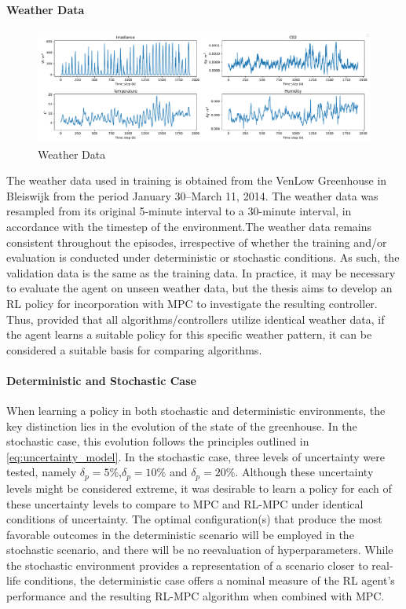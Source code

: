 \paragraph{Weather Data}

\begin{figure}[h]
    \centering
    \includegraphics[width=\textwidth]{figures/weather_data.pdf}
    \caption{Weather Data}
    \label{fig:weather-data}
\end{figure}

The weather data used in training is obtained from the VenLow Greenhouse in Bleiswijk from the period January 30–March 11, 2014. The weather data was resampled from its original 5-minute interval to a 30-minute interval, in accordance with the timestep of the environment.The weather data remains consistent throughout the episodes, irrespective of whether the training and/or evaluation is conducted under deterministic or stochastic conditions. As such, the validation data is the same as the training data. In practice, it may be necessary to evaluate the agent on unseen weather data, but the thesis aims to develop an RL policy for incorporation with MPC to investigate the resulting controller. Thus, provided that all algorithms/controllers utilize identical weather data, if the agent learns a suitable policy for this specific weather pattern, it can be considered a suitable basis for comparing algorithms.


\paragraph{Deterministic and Stochastic Case}
When learning a policy in both stochastic and deterministic environments, the key distinction lies in the evolution of the state of the greenhouse. In the stochastic case, this evolution follows the principles outlined in \autoref{eq:uncertainty_model}. In the stochastic case, three levels of uncertainty were tested, namely $\delta_p = 5\%$,$\delta_p = 10\%$ and $\delta_p = 20\%$. Although these uncertainty levels might be considered extreme, it was desirable to learn a policy for each of these uncertainty levels to compare to MPC and RL-MPC under identical conditions of uncertainty. The optimal configuration(s) that produce the most favorable outcomes in the deterministic scenario will be employed in the stochastic scenario, and there will be no reevaluation of hyperparameters. While the stochastic environment provides a representation of a scenario closer to real-life conditions, the deterministic case offers a nominal measure of the RL agent's performance and the resulting RL-MPC algorithm when combined with MPC.

